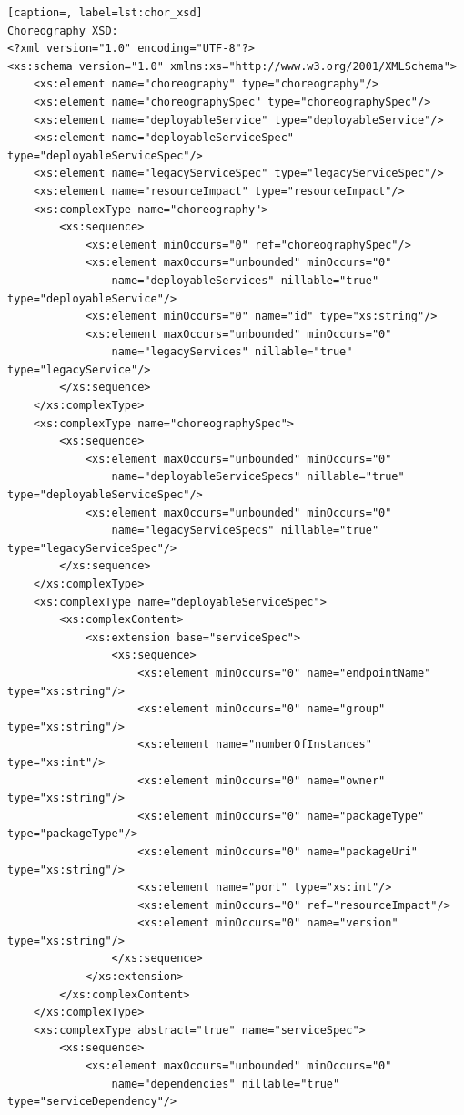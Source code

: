 \documentclass[a4paper, 10pt]{article}
\begin{document}
{\begin{lstlisting}[caption=, label=lst:chor_xsd]
Choreography XSD:
<?xml version="1.0" encoding="UTF-8"?>
<xs:schema version="1.0" xmlns:xs="http://www.w3.org/2001/XMLSchema">
    <xs:element name="choreography" type="choreography"/>
    <xs:element name="choreographySpec" type="choreographySpec"/>
    <xs:element name="deployableService" type="deployableService"/>
    <xs:element name="deployableServiceSpec" type="deployableServiceSpec"/>
    <xs:element name="legacyServiceSpec" type="legacyServiceSpec"/>
    <xs:element name="resourceImpact" type="resourceImpact"/>
    <xs:complexType name="choreography">
        <xs:sequence>
            <xs:element minOccurs="0" ref="choreographySpec"/>
            <xs:element maxOccurs="unbounded" minOccurs="0"
                name="deployableServices" nillable="true" type="deployableService"/>
            <xs:element minOccurs="0" name="id" type="xs:string"/>
            <xs:element maxOccurs="unbounded" minOccurs="0"
                name="legacyServices" nillable="true" type="legacyService"/>
        </xs:sequence>
    </xs:complexType>
    <xs:complexType name="choreographySpec">
        <xs:sequence>
            <xs:element maxOccurs="unbounded" minOccurs="0"
                name="deployableServiceSpecs" nillable="true" type="deployableServiceSpec"/>
            <xs:element maxOccurs="unbounded" minOccurs="0"
                name="legacyServiceSpecs" nillable="true" type="legacyServiceSpec"/>
        </xs:sequence>
    </xs:complexType>
    <xs:complexType name="deployableServiceSpec">
        <xs:complexContent>
            <xs:extension base="serviceSpec">
                <xs:sequence>
                    <xs:element minOccurs="0" name="endpointName" type="xs:string"/>
                    <xs:element minOccurs="0" name="group" type="xs:string"/>
                    <xs:element name="numberOfInstances" type="xs:int"/>
                    <xs:element minOccurs="0" name="owner" type="xs:string"/>
                    <xs:element minOccurs="0" name="packageType" type="packageType"/>
                    <xs:element minOccurs="0" name="packageUri" type="xs:string"/>
                    <xs:element name="port" type="xs:int"/>
                    <xs:element minOccurs="0" ref="resourceImpact"/>
                    <xs:element minOccurs="0" name="version" type="xs:string"/>
                </xs:sequence>
            </xs:extension>
        </xs:complexContent>
    </xs:complexType>
    <xs:complexType abstract="true" name="serviceSpec">
        <xs:sequence>
            <xs:element maxOccurs="unbounded" minOccurs="0"
                name="dependencies" nillable="true" type="serviceDependency"/>

\end{lstlisting}}
\end{document}
